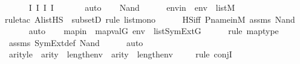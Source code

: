 \begin{isabellebody}
\ \ \ \ \isamarkupfalse%
\ I{}\ I{}\ I{}\ I{}\ \isanewline
\ \ \ \ \isamarkupfalse%
\ auto\isanewline
{}\isamarkupfalse%
\isanewline
\ \ \isamarkupfalse%
\ {\isacharparenleft}{\kern0pt}Nand\ {\isasymphi}\ {\isasympsi}{\isacharparenright}{\kern0pt}\isanewline
\isanewline
\ \ \isamarkupfalse%
\ envin\ {\isacharcolon}{\kern0pt}\ {\isachardoublequoteopen}env\ {\isasymin}\ list{\isacharparenleft}{\kern0pt}M{\isacharparenright}{\kern0pt}{\isachardoublequoteclose}\ \isanewline
\ \ \ \ \isamarkupfalse%
{\isacharparenleft}{\kern0pt}rule{\isacharunderscore}{\kern0pt}tac\ A{\isacharequal}{\kern0pt}{\isachardoublequoteopen}list{\isacharparenleft}{\kern0pt}HS{\isacharparenright}{\kern0pt}{\isachardoublequoteclose}\ \ subsetD{\isacharcomma}{\kern0pt}\ rule\ list{\isacharunderscore}{\kern0pt}mono{\isacharparenright}{\kern0pt}\isanewline
\ \ \ \ \isamarkupfalse%
\ HS{\isacharunderscore}{\kern0pt}iff\ P{\isacharunderscore}{\kern0pt}name{\isacharunderscore}{\kern0pt}in{\isacharunderscore}{\kern0pt}M\ assms\ Nand\isanewline
\ \ \ \ \isamarkupfalse%
\ auto\isanewline
\ \ \isamarkupfalse%
\ mapin\ {\isacharcolon}{\kern0pt}\ {\isachardoublequoteopen}map{\isacharparenleft}{\kern0pt}val{\isacharparenleft}{\kern0pt}G{\isacharparenright}{\kern0pt}{\isacharcomma}{\kern0pt}\ env{\isacharparenright}{\kern0pt}\ {\isasymin}\ list{\isacharparenleft}{\kern0pt}SymExt{\isacharparenleft}{\kern0pt}G{\isacharparenright}{\kern0pt}{\isacharparenright}{\kern0pt}{\isachardoublequoteclose}\ \isanewline
\ \ \ \ \isamarkupfalse%
{\isacharparenleft}{\kern0pt}rule\ map{\isacharunderscore}{\kern0pt}type{\isacharparenright}{\kern0pt}\isanewline
\ \ \ \ \isamarkupfalse%
\ assms\ SymExt{\isacharunderscore}{\kern0pt}def\ Nand\isanewline
\ \ \ \ \isamarkupfalse%
\ auto\isanewline
\ \ \isamarkupfalse%
\ arityle\ {\isacharcolon}{\kern0pt}\ {\isachardoublequoteopen}arity{\isacharparenleft}{\kern0pt}{\isasymphi}{\isacharparenright}{\kern0pt}\ {\isasymle}\ length{\isacharparenleft}{\kern0pt}env{\isacharparenright}{\kern0pt}\ {\isasymand}\ arity{\isacharparenleft}{\kern0pt}{\isasympsi}{\isacharparenright}{\kern0pt}\ {\isasymle}\ length{\isacharparenleft}{\kern0pt}env{\isacharparenright}{\kern0pt}{\isachardoublequoteclose}\isanewline
\ \ \ \ \isamarkupfalse%
{\isacharparenleft}{\kern0pt}rule\ conjI{\isacharparenright}{\kern0pt}\isanewline

\end{isabellebody}
